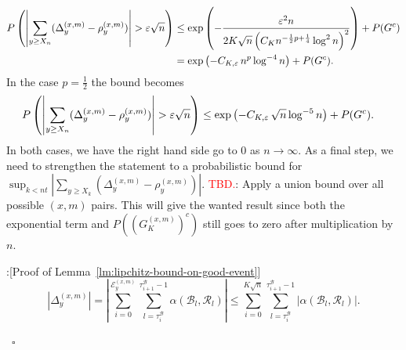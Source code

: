\documentclass[twoside,12pt,a4paper]{article}
\numberwithin{equation}{section}
\newenvironment{proof}{{\sc Proof}:}{~\hfill $\square$}
\newcommand\TBD{\textcolor{red}{TBD.}}
\begin{document}
{\begin{align}
	P\left( \left| \sum_{y\ge X_n} (\Delta_y^{(x,m)} - \rho_y^{(x,m)})  \right| > \varepsilon \sqrt{n}  \right) \notag
	&\le \exp\left( - \frac{\varepsilon^2 n}{2 K \sqrt{n} \left( C_{K} n^{-\frac{1}{2}p + \frac{1}{4}} \log^2 n  \right)^2 } \right) + P(G^c) \notag \\
	&= \exp\left( - C_{K, \varepsilon} \, n^{p } \log^{-4} n \right) +P(G^c) \label{eqn:azuma-drift-martingale}
.\end{align}
In the case $p = \frac{1}{2}$ the bound becomes
\begin{align}
	P\left( \left| \sum_{y \ge X_n} (\Delta_y^{(x,m)} - \rho_y^{(x,m)}) \right|  > \varepsilon \sqrt{n}  \right) \notag
	&\le  \exp\left( - C_{K, \varepsilon} \, \sqrt{n}  \log^{-5} n \right) +P(G^c) 
.\end{align}
In both cases, we have the right hand side go to $0$ as $n \to  \infty $. As a final step, we need to strengthen the statement to a probabilistic bound for $\sup_{k < nt} \left| \sum_{y \ge X_k} (\Delta_y^{(x,m)} - \rho_y^{(x,m)}) \right|$. \TBD: Apply a union bound over all possible $(x,m)$ pairs. This will give the wanted result since both the exponential term and $P((G_K^{(x,m)})^c)$ still goes to zero after multiplication by $n$.

\begin{proof}[Proof of Lemma~\ref{lm:lipchitz-bound-on-good-event}]
	\begin{equation*}
	\left| \Delta_y^{(x,m)} \right| 
	= 
	\left| 	\sum_{i = 0}^{\mathcal{E}_y^{(x,m)}} 
	\sum_{l = \tau_i^{\mathcal{B}}} ^{\tau_{i+1}^{\mathcal{B}}  -1}
	\alpha(\mathcal{B}_l, \mathcal{R}_l)
	\right| 
	\le 
	\sum_{i = 0}^{K \sqrt{n} } 
	\sum_{l = \tau_i^{\mathcal{B}}} ^{\tau_{i+1}^{\mathcal{B}}  -1}
	\left|
	\alpha(\mathcal{B}_l, \mathcal{R}_l)
	\right| 
	.
\end{equation*}


\end{proof}}
\end{document}
